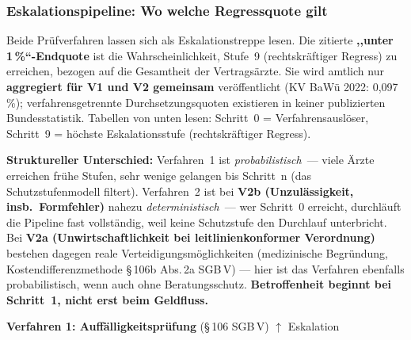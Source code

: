 \documentclass{umbruch-position}
\begin{document}
\subsubsection*{Eskalationspipeline: Wo welche Regressquote gilt}

Beide Prüfverfahren lassen sich als Eskalationstreppe lesen. Die zitierte \textbf{,,unter 1\,\%``-Endquote} ist die Wahrscheinlichkeit, Stufe~9 (rechtskräftiger Regress) zu erreichen, bezogen auf die Gesamtheit der Vertragsärzte. Sie wird amtlich nur \textbf{aggregiert für V1 und V2 gemeinsam} veröffentlicht (KV BaWü 2022: 0,097\,\%); verfahrensgetrennte Durchsetzungsquoten existieren in keiner publizierten Bundesstatistik. Tabellen von unten lesen: Schritt~0 = Verfahrensauslöser, Schritt~9 = höchste Eskalationsstufe (rechtskräftiger Regress).

\smallskip\noindent \textbf{Struktureller Unterschied:} Verfahren~1 ist \textit{probabilistisch}~--- viele Ärzte erreichen frühe Stufen, sehr wenige gelangen bis Schritt~n (das Schutzstufenmodell filtert). Verfahren~2 ist bei \textbf{V2b (Unzul\"assigkeit, insb.\ Formfehler)} nahezu \textit{deterministisch}~--- wer Schritt~0 erreicht, durchl\"auft die Pipeline fast vollst\"andig, weil keine Schutzstufe den Durchlauf unterbricht. Bei \textbf{V2a (Unwirtschaftlichkeit bei leitlinienkonformer Verordnung)} bestehen dagegen reale Verteidigungsm\"oglichkeiten (medizinische Begr\"undung, Kostendifferenzmethode \S\,106b Abs.\,2a SGB\,V) --- hier ist das Verfahren ebenfalls probabilistisch, wenn auch ohne Beratungsschutz. \textbf{Betroffenheit beginnt bei Schritt~1, nicht erst beim Geldfluss.}

\medskip
\noindent\textbf{Verfahren 1: Auffälligkeitsprüfung} (\S\,106 SGB\,V)
\hfill{\small$\uparrow$ Eskalation}
\end{document}

